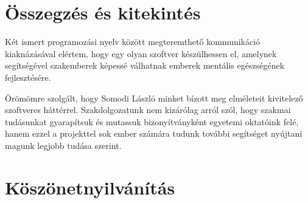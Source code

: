 \documentclass[tocnopagenum]{thesis-ekf}
\theoremstyle{definition}
\theoremstyle{remark}
\begin{document}
	\chapter*{Összegzés és kitekintés}
	Két ismert programozási nyelv között megteremthető kommunikáció kiaknázásával elértem, hogy egy olyan szoftver készülhessen el, amelynek segítségével szakemberek képessé válhatnak emberek mentális egészségének fejlesztésére. 
	
	Örömömre szolgált, hogy Somodi László minket bízott meg elméleteit kivitelező szoftveres háttérrel. Szakdolgozatunk nem kizárólag arról szól, hogy szakmai tudásunkat gyarapítsuk és mutassuk bizonyítványként egyetemi oktatóink felé, hanem ezzel a projekttel sok ember számára tudunk további segítséget nyújtani magunk legjobb tudása szerint.
	\chapter*{Köszönetnyilvánítás}
	
	
	
	\listoffigures
\end{document}
